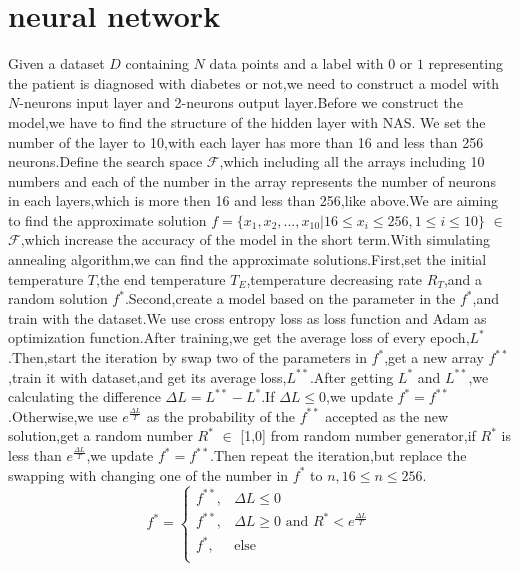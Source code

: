 \documentclass[twocolumn,10pt]{article}
\begin{document}
\section{neural network}
Given a dataset $D$ containing $N$ data points and a label with $0$ or $1$ representing the patient is diagnosed with diabetes or not,we need to construct a model with $N$-neurons input layer and 2-neurons output layer.Before we construct the model,we have to find the structure of the hidden layer with NAS.
We set the number of the layer to 10,with each layer has more than 16 and less than 256 neurons.Define the search space $\mathcal{F}$,which including all the arrays including 10 numbers and each of the number in the array represents the number of neurons in each layers,which is more then 16 and less than 256,like above.We are aiming to find the approximate solution $f= \{x_1,x_2,...,x_{10}|16\leq x_i \leq 256,1\leq i \leq 10\}$ $\in$ $\mathcal{F}$,which increase the accuracy of the model in the short term.With simulating annealing algorithm\cite{17235},we can find the approximate solutions.First,set the initial temperature $T$,the end temperature $T_E$,temperature decreasing rate $R_T$,and a random solution $f^*$.Second,create a model based on the parameter in the $f^*$,and train with the dataset.We use cross entropy loss as loss function and Adam as optimization function.After training,we get the average loss of every epoch,$L^*$.Then,start the iteration by swap two of the parameters in $f^*$,get a new array $f^{**}$,train it with dataset,and get its average loss,$L^{**}$.After getting $L^*$ and $L^{**}$,we calculating the difference $\Delta L = L^{**} - L^*$.If $\Delta L \leq 0$,we update $f^* = f^{**}$.Otherwise,we use $e^{\frac{\Delta L}{T}}$ as the probability of the $f^{**}$ accepted as the new solution,get a random number $R^*$ $\in$ [1,0] from random number generator,if $R^*$ is less than $e^{\frac{\Delta L}{T}}$,we update $f^* = f^{**}$.Then repeat the iteration,but replace the swapping with changing one of the number in $f^*$ to $n,16 \leq n \leq 256$.
 \begin{equation}
    f^* = 
    \begin{cases}
    f^{**}, &\Delta L\le 0 \\
    f^{**}, &\Delta L \ge 0 \text{ and } R^*<e^{\frac{\Delta L}{T}} \\ 
    f^{*},  &\text{else}\\
    \end{cases}
\end{equation} 
\end{document}
